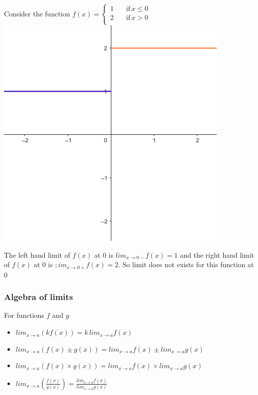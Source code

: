 \documentclass[12pt]{article}
\begin{document}
Consider the function $f(x)=\begin{cases}
    1 \quad &\text{if} \, x \leq 0 \\
    2 \quad &\text{if} \, x >0 \\
\end{cases}$
\includegraphics*[scale=0.3]{3.png}

The left hand limit of $f (x)$ at $0$ is $lim_{x \rightarrow 0-} f(x)=1$ and the right hand limit of $f (x)$ at $0$ is $;im_{x \rightarrow 0+} f(x)=2$. So limit does not exists for this function at 0

\subsubsection*{Algebra of limits}
For functions $f$ and $g$
\begin{itemize}
    \item $lim_{x \rightarrow a}(kf(x))=k \, lim_{x \rightarrow a} f(x)$
    \item $lim_{x \rightarrow a}(f(x) \pm g(x))= lim_{x \rightarrow a}f(x) \pm lim_{x \rightarrow a} g(x)$
    \item $lim_{x \rightarrow a}(f(x) \times g(x))= lim_{x \rightarrow a}f(x) \times lim_{x \rightarrow a} g(x)$
    \item $lim_{x \rightarrow a}(\frac{f(x)}  {g(x)})=\frac{ lim_{x \rightarrow a}f(x)} { lim_{x \rightarrow a} g(x)}$

\end{itemize}
\end{document}
